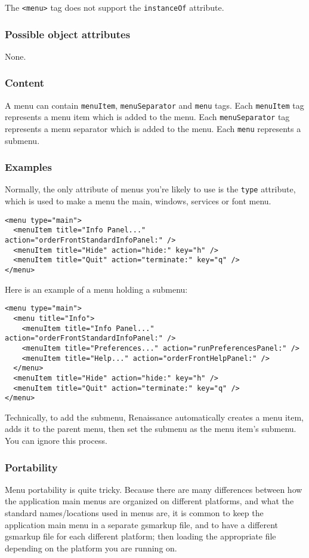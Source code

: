 The \texttt{<menu>} tag does not support the \texttt{instanceOf} attribute.

\subsubsection{Possible object attributes}
None.

\subsubsection{Content}
A menu can contain \texttt{menuItem}, \texttt{menuSeparator} and
\texttt{menu} tags.  Each \texttt{menuItem} tag represents a menu item
which is added to the menu.  Each \texttt{menuSeparator} tag
represents a menu separator which is added to the menu.  Each
\texttt{menu} represents a submenu.

\subsubsection{Examples}
Normally, the only attribute of menus you're likely to use is the 
\texttt{type} attribute, which is used to make a menu the main, windows, 
services or font menu.
\begin{verbatim}
<menu type="main">
  <menuItem title="Info Panel..." action="orderFrontStandardInfoPanel:" />
  <menuItem title="Hide" action="hide:" key="h" />
  <menuItem title="Quit" action="terminate:" key="q" />
</menu>
\end{verbatim}

Here is an example of a menu holding a submenu:
\begin{verbatim}
<menu type="main">
  <menu title="Info">
    <menuItem title="Info Panel..." action="orderFrontStandardInfoPanel:" />
    <menuItem title="Preferences..." action="runPreferencesPanel:" />
    <menuItem title="Help..." action="orderFrontHelpPanel:" />
  </menu>
  <menuItem title="Hide" action="hide:" key="h" />
  <menuItem title="Quit" action="terminate:" key="q" />
</menu>
\end{verbatim}
Technically, to add the submenu, Renaissance automatically creates a
menu item, adds it to the parent menu, then set the submenu as the
menu item's submenu.  You can ignore this process.

\subsubsection{Portability}
Menu portability is quite tricky.  Because there are many differences
between how the application main menus are organized on different
platforms, and what the standard names/locations used in menus are, it
is common to keep the application main menu in a separate gsmarkup
file, and to have a different gsmarkup file for each different
platform; then loading the appropriate file depending on the platform
you are running on.

